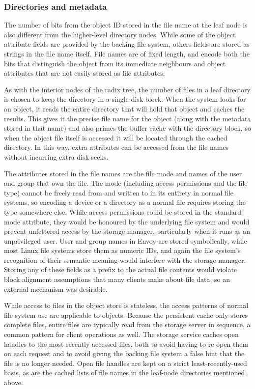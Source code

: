 \subsubsection{Directories and metadata}

The number of bits from the object ID stored in the file name at the leaf node is also different from the higher-level directory nodes. While some of the object attribute fields are provided by the backing file system, others fields are stored as strings in the file name itself. File names are of fixed length, and encode both the bits that distinguish the object from its immediate neighbours and object attributes that are not easily stored as file attributes.

As with the interior nodes of the radix tree, the number of files in a leaf directory is chosen to keep the directory in a single disk block. When the system looks for an object, it reads the entire directory that will hold that object and caches the results. This gives it the precise file name for the object (along with the metadata stored in that name) and also primes the buffer cache with the directory block, so when the object file itself is accessed it will be located through the cached directory. In this way, extra attributes can be accessed from the file names without incurring extra disk seeks.

The attributes stored in the file names are the file mode and names of the user and group that own the file. The mode (including access permissions and the file type) cannot be freely read from and written to in its entirety in normal file systems, so encoding a device or a directory as a normal file requires storing the type somewhere else. While access permissions could be stored in the standard mode attribute, they would be honoured by the underlying file system and would prevent unfettered access by the storage manager, particularly when it runs as an unprivileged user. User and group names in Envoy are stored symbolically, while most Linux file systems store them as numeric IDs, and again the file system's recognition of their semantic meaning would interfere with the storage manager. Storing any of these fields as a prefix to the actual file contents would violate block alignment assumptions that many clients make about file data, so an external mechanism was desirable.

While access to files in the object store is stateless, the access patterns of normal file system use are applicable to objects. Because the persistent cache only stores complete files, entire files are typically read from the storage server in sequence, a common pattern for client operations as well. The storage service caches open handles to the most recently accessed files, both to avoid having to re-open them on each request and to avoid giving the backing file system a false hint that the file is no longer needed. Open file handles are kept on a strict least-recently-used basis, as are the cached lists of file names in the leaf-node directories mentioned above.

